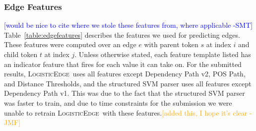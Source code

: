 \documentclass[11pt]{article}
\newcommand{\sam}[1]{\textcolor{blue}{[#1 -SMT]}}
\newcommand{\jmf}[1]{\textcolor{orange}{[#1 -JMF]}}
\newcommand{\logitedge}{\textsc{LogisticEdge}}
\begin{document}
\subsubsection{Edge Features}
\label{s:edgefeatures}

\label{s:features}

\sam{would be nice to cite where we stole these features from, where applicable}
Table~\ref{table:edgefeatures} describes the features we used for predicting
edges.
These features were computed over an edge $e$ with parent token $s$ at
index $i$ and child token $t$ at index $j$. 
Unless otherwise stated, each feature template listed has an indicator
feature that fires for each value it can take on.  For the submitted results,
\logitedge~uses all features except Dependency Path v2, POS Path, and Distance
Thresholds, and the structured SVM parser uses all features except Dependency
Path v1.  This was due to the fact that the structured SVM parser was faster to
train, and due to time constraints for the submission we were unable to retrain
\logitedge~with these features.\jmf{added this, I hope it's clear}
\end{document}
